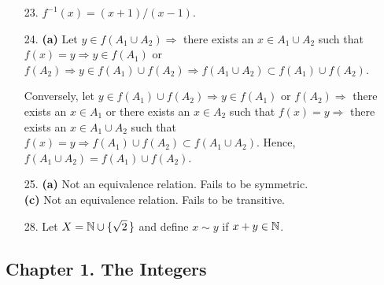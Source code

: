 {\begin{itemize}
\bf\item[23.]\rm
$f^{-1}(x) = (x+1)/(x-1)$.
 
\bf\item[24.]\rm
{\bf (a)}  Let $y \in f(A_1 \cup A_2) \Rightarrow$ there exists an $x
\in A_1 \cup A_2$ such that $f(x) = y \Rightarrow y \in f(A_1)$ or
$f(A_2) \Rightarrow y \in f(A_1) \cup f(A_2) \Rightarrow f(A_1 \cup A_2)
\subset f(A_1) \cup f(A_2)$.
 
Conversely, let $y \in f(A_1) \cup f(A_2) \Rightarrow y \in f(A_1)$ or
$f(A_2) \Rightarrow$ there exists an $x \in A_1$ or there exists an
$x \in A_2$ such that $f(x) = y \Rightarrow$ there exists an $x \in
A_1 \cup A_2$ such that $f(x) = y \Rightarrow f(A_1) \cup f(A_2)
\subset f(A_1 \cup A_2)$. Hence, $f(A_1 \cup A_2) = f(A_1) \cup f(A_2)$. 
 
\bf\item[25.]\rm
{\bf (a)} Not an equivalence relation. Fails to be symmetric.\\
{\bf (c)} Not an equivalence relation. Fails to be transitive.
 
\bf\item[28.]\rm
Let $X = {\Bbb N} \cup \{ \sqrt{2}\, \}$ and define $x \sim y$ if $x + y
\in {\Bbb N}$.
 
\end{itemize}
}
 
 
 
\subsection*{Chapter 1. The Integers}
 
